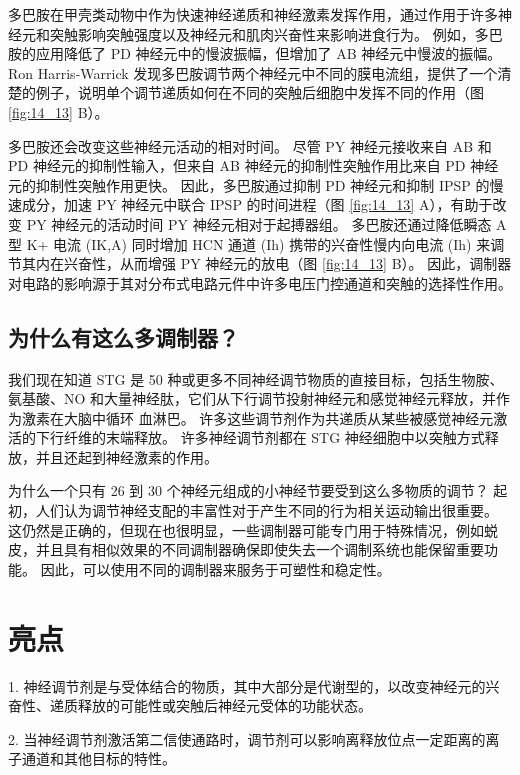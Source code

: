 多巴胺在甲壳类动物中作为快速神经递质和神经激素发挥作用，通过作用于许多神经元和突触影响突触强度以及神经元和肌肉兴奋性来影响进食行为。 
例如，多巴胺的应用降低了 PD 神经元中的慢波振幅，但增加了 AB 神经元中慢波的振幅。 
Ron Harris-Warrick 发现多巴胺调节两个神经元中不同的膜电流组，提供了一个清楚的例子，说明单个调节递质如何在不同的突触后细胞中发挥不同的作用（图 \ref{fig:14_13} B）。


多巴胺还会改变这些神经元活动的相对时间。 
尽管 PY 神经元接收来自 AB 和 PD 神经元的抑制性输入，但来自 AB 神经元的抑制性突触作用比来自 PD 神经元的抑制性突触作用更快。 
因此，多巴胺通过抑制 PD 神经元和抑制 IPSP 的慢速成分，加速 PY 神经元中联合 IPSP 的时间进程（图 \ref{fig:14_13} A），有助于改变 PY 神经元的活动时间 PY 神经元相对于起搏器组。 
多巴胺还通过降低瞬态 A 型 K+ 电流 (IK,A) 同时增加 HCN 通道 (Ih) 携带的兴奋性慢内向电流 (Ih) 来调节其内在兴奋性，从而增强 PY 神经元的放电（图 \ref{fig:14_13} B）。 
因此，调制器对电路的影响源于其对分布式电路元件中许多电压门控通道和突触的选择性作用。



\subsection{为什么有这么多调制器？}

我们现在知道 STG 是 50 种或更多不同神经调节物质的直接目标，包括生物胺、氨基酸、NO 和大量神经肽，它们从下行调节投射神经元和感觉神经元释放，并作为激素在大脑中循环 血淋巴。 
许多这些调节剂作为共递质从某些被感觉神经元激活的下行纤维的末端释放。
许多神经调节剂都在 STG 神经细胞中以突触方式释放，并且还起到神经激素的作用。


为什么一个只有 26 到 30 个神经元组成的小神经节要受到这么多物质的调节？ 
起初，人们认为调节神经支配的丰富性对于产生不同的行为相关运动输出很重要。 
这仍然是正确的，但现在也很明显，一些调制器可能专门用于特殊情况，例如蜕皮，并且具有相似效果的不同调制器确保即使失去一个调制系统也能保留重要功能。 
因此，可以使用不同的调制器来服务于可塑性和稳定性。



\section{亮点}

1. 神经调节剂是与受体结合的物质，其中大部分是代谢型的，以改变神经元的兴奋性、递质释放的可能性或突触后神经元受体的功能状态。 


2. 当神经调节剂激活第二信使通路时，调节剂可以影响离释放位点一定距离的离子通道和其他目标的特性。 


